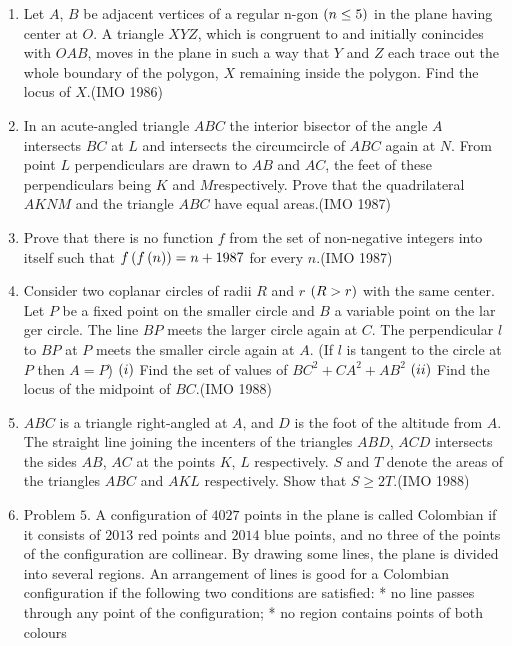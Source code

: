 \begin{enumerate}
    \item Let $A$, $B$ be adjacent vertices of a regular n-gon $\left(n\leq5\right)$ in the plane having center at $O$. A triangle $XYZ$, which is congruent to and initially conincides with $OAB$, moves in the plane in such a way that $Y$ and $Z$ each trace out the whole boundary of the polygon, $X$ remaining inside the polygon. Find the locus of $X$.\hfill(IMO 1986)

    \item In an acute-angled triangle $ABC$ the interior bisector of the angle $A$ intersects $BC$ at $L$ and intersects the circumcircle of $ABC$ again at $N$. From point $L$ perpendiculars are drawn to $AB$ and $AC$, the feet of these perpendiculars being $K$ and $M$respectively. Prove that the quadrilateral $AKNM$ and the triangle $ABC$ have equal areas.\hfill(IMO 1987)

    \item Prove that there is no function $f$ from the set of non-negative integers into itself such that $f\left(f\left(n\right)\right)=n+1987$ for every $n$.\hfill(IMO 1987)

    \item Consider two coplanar circles of radii $R$ and $r$ $\left(R > r\right)$ with the same center. Let $P$ be a fixed point on the smaller circle and $B$ a variable point on the lar ger circle. The line $BP$ meets the larger circle again at $C$. The perpendicular $l$ to $BP $ at $P$ meets the smaller circle again at $A$. (If $l$ is tangent to the circle at $P$ then $A = P$)
                 $\left(i\right)$ Find the set of values of $BC^2+CA^2+AB^2$ 
                 $\left(ii\right)$ Find the locus of the midpoint of $BC$.\hfill(IMO 1988)

\item $ABC$ is a triangle right-angled at $A$, and $D$ is the foot of the altitude from $A$. The straight line joining the incenters of the triangles $ABD$, $ACD$ intersects the sides $AB$, $AC$ at the points $K$, $L$ respectively. $S$ and $T$ denote the areas of the triangles $ABC$ and $AKL$ respectively. Show that $S\geq 2T$.\hfill(IMO 1988)
\item Problem $5$. A configuration of $4027$ points in the plane is called Colombian if it consists of $2013$ red points and $2014$ blue points, and no three of the points of the configuration are collinear. By drawing some lines, the plane is divided into several regions. An arrangement of lines is good for a Colombian configuration if the following two conditions are satisfied:
 * no line passes through any point of the configuration;
* no region contains points of both colours


\end{enumerate}

